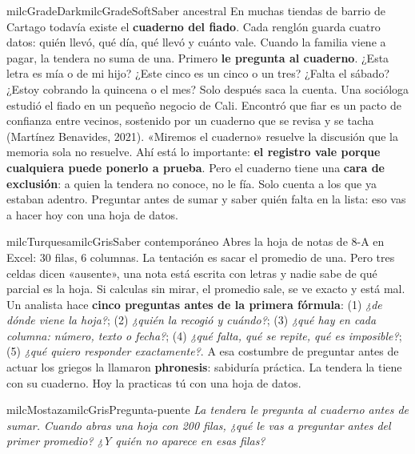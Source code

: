 \documentclass[11pt,letterpaper]{article}
\begin{document}
\begin{softbox}{milcGradeDark}{milcGradeSoft}{Saber ancestral}
En muchas tiendas de barrio de Cartago todavía existe el \textbf{cuaderno del fiado}. Cada renglón guarda cuatro datos: quién llevó, qué día, qué llevó y cuánto vale. Cuando la familia viene a pagar, la tendera no suma de una. Primero \textbf{le pregunta al cuaderno}. ¿Esta letra es mía o de mi hijo? ¿Este cinco es un cinco o un tres? ¿Falta el sábado? ¿Estoy cobrando la quincena o el mes? Solo después saca la cuenta. Una socióloga estudió el fiado en un pequeño negocio de Cali. Encontró que fiar es un pacto de confianza entre vecinos, sostenido por un cuaderno que se revisa y se tacha (Martínez Benavides, 2021). «Miremos el cuaderno» resuelve la discusión que la memoria sola no resuelve. Ahí está lo importante: \textbf{el registro vale porque cualquiera puede ponerlo a prueba}. Pero el cuaderno tiene una \textbf{cara de exclusión}: a quien la tendera no conoce, no le fía. Solo cuenta a los que ya estaban adentro. Preguntar antes de sumar y saber quién falta en la lista: eso vas a hacer hoy con una hoja de datos.\par{}
\end{softbox}

\begin{softbox}{milcTurquesa}{milcGris}{Saber contemporáneo}
Abres la hoja de notas de 8-A en Excel: 30 filas, 6 columnas. La tentación es sacar el promedio de una. Pero tres celdas dicen «ausente», una nota está escrita con letras y nadie sabe de qué parcial es la hoja. Si calculas sin mirar, el promedio sale, se ve exacto y está mal. Un analista hace \textbf{cinco preguntas antes de la primera fórmula}: (1) \emph{¿de dónde viene la hoja?}; (2) \emph{¿quién la recogió y cuándo?}; (3) \emph{¿qué hay en cada columna: número, texto o fecha?}; (4) \emph{¿qué falta, qué se repite, qué es imposible?}; (5) \emph{¿qué quiero responder exactamente?}. A esa costumbre de preguntar antes de actuar los griegos la llamaron \textbf{phronesis}: sabiduría práctica. La tendera la tiene con su cuaderno. Hoy la practicas tú con una hoja de datos.
\end{softbox}

\begin{softbox}{milcMostaza}{milcGris}{Pregunta-puente}
\textit{La tendera le pregunta al cuaderno antes de sumar. Cuando abras una hoja con 200 filas, ¿qué le vas a preguntar antes del primer promedio? ¿Y quién no aparece en esas filas?}
\end{softbox}
\end{document}
